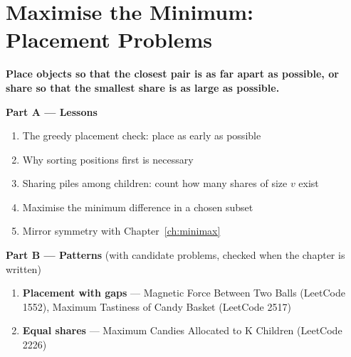 \chapter{Maximise the Minimum: Placement Problems}
\label{ch:maximin}

\begin{tcolorbox}[enhanced, colback=white, colframe=secondaryblue, boxrule=1pt, arc=2mm]
\textbf{\large\textcolor{primaryblue}{Place objects so that the closest pair is as far apart as possible, or share so that the smallest share is as large as possible.}}
\end{tcolorbox}


\begin{plannedbox}
\textbf{Part A --- Lessons}
\begin{enumerate}[leftmargin=*, label=\textbf{A\arabic*.}, itemsep=1pt]
    \item The greedy placement check: place as early as possible
    \item Why sorting positions first is necessary
    \item Sharing piles among children: count how many shares of size $v$ exist
    \item Maximise the minimum difference in a chosen subset
    \item Mirror symmetry with Chapter~\ref{ch:minimax}
\end{enumerate}
\textbf{Part B --- Patterns} (with candidate problems, checked when the chapter is written)
\begin{enumerate}[leftmargin=*, label=\textbf{P\arabic*.}, itemsep=1pt]
    \item \textbf{Placement with gaps} --- Magnetic Force Between Two Balls {\small\color{darkgray}(LeetCode 1552)}, Maximum Tastiness of Candy Basket {\small\color{darkgray}(LeetCode 2517)}
    \item \textbf{Equal shares} --- Maximum Candies Allocated to K Children {\small\color{darkgray}(LeetCode 2226)}
\end{enumerate}
\end{plannedbox}
